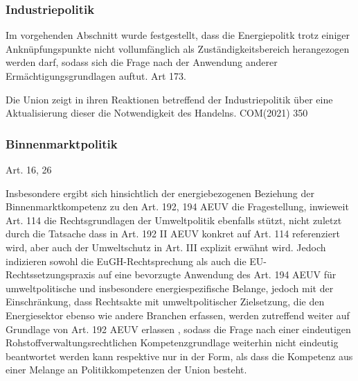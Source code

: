 \documentclass[12pt,a4paper,oneside]{book} %
\begin{document}
	\subsubsection{Industriepolitik}
	Im vorgehenden Abschnitt wurde festgestellt, dass die Energiepolitk trotz einiger Anknüpfungspunkte nicht vollumfänglich als Zuständigkeitsbereich herangezogen werden darf, sodass sich die Frage nach der Anwendung anderer Ermächtigungsgrundlagen auftut.
	Art 173.
	
	Die Union zeigt in ihren Reaktionen betreffend der Industriepolitik über eine Aktualisierung dieser die Notwendigkeit des Handelns.
	COM(2021) 350
	
	\subsubsection{Binnenmarktpolitik}
	Art. 16, 26
	
	Insbesondere ergibt sich hinsichtlich der energiebezogenen Beziehung der Binnenmarktkompetenz zu den Art. 192, 194 AEUV die Fragestellung, inwieweit Art. 114 die Rechtsgrundlagen der Umweltpolitik ebenfalls stützt, nicht zuletzt durch die Tatsache dass in Art. 192 II AEUV konkret auf Art. 114 referenziert wird, aber auch der Umweltschutz in Art. III explizit erwähnt wird.\autocite[siehe insbesondere hierzu Gundel §m Rn 28f]{dauses_handbuch_2024} Jedoch indizieren sowohl die EuGH-Rechtsprechung als auch die EU-Rechtssetzungspraxis auf eine bevorzugte Anwendung des Art. 194 AEUV für umweltpolitische und insbesondere energiespezifische Belange, jedoch mit der Einschränkung, dass \glqq Rechtsakte mit umweltpolitischer Zielsetzung, die den Energiesektor ebenso wie andere Branchen erfassen, werden zutreffend weiter auf Grundlage von Art. 192 AEUV erlassen \grqq\autocite[Gundel §m Rn 29]{dauses_handbuch_2024}, sodass die Frage nach einer eindeutigen Rohstoffverwaltungsrechtlichen Kompetenzgrundlage weiterhin nicht eindeutig beantwortet werden kann respektive nur in der Form, als dass die Kompetenz aus einer Melange an Politikkompetenzen der Union besteht.
	
\end{document}
